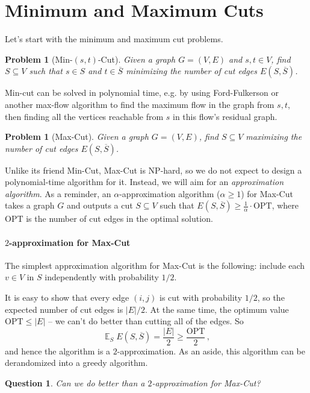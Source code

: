 \documentclass[11pt]{article}
\newtheorem{problem}[theorem]{Problem}
\newtheorem*{question}{Question}
\DeclareMathOperator{\E}{\mathbb{E}} %
\begin{document}
\section{Minimum and Maximum Cuts}

Let's start with the minimum and maximum cut problems.
\begin{problem}[Min-$(s,t)$-Cut]
Given a graph $G = (V,E)$ and $s,t \in V$, find $S \subseteq V$ such that $s \in S$ and $t \in \overline{S}$ minimizing the number of cut edges $E(S,\overline{S})$.
\end{problem}

Min-cut can be solved in polynomial time, e.g. by using Ford-Fulkerson or another max-flow algorithm to find the maximum flow in the graph from $s,t$, then finding all the vertices reachable from $s$ in this flow's residual graph.

\begin{problem}[Max-Cut]
Given a graph $G = (V,E)$, find $S \subseteq V$ maximizing the number of cut edges $E(S,\overline{S})$.
\end{problem}

Unlike its friend Min-Cut, Max-Cut is NP-hard, so we do not expect to design a polynomial-time algorithm for it.
Instead, we will aim for an \emph{approximation algorithm}.
As a reminder, an $\alpha$-approximation algorithm ($\alpha \geq 1$) for Max-Cut takes a graph $G$ and outputs a cut $S \subseteq V$ such that $E(S,\overline{S}) \geq \frac 1 \alpha \cdot \text{OPT}$, where $\text{OPT}$ is the number of cut edges in the optimal solution.

\paragraph{$2$-approximation for Max-Cut}
The simplest approximation algorithm for Max-Cut is the following: include each $v \in V$ in $S$ independently with probability $1/2$.

It is easy to show that every edge $(i,j)$ is cut with probability $1/2$, so the expected number of cut edges is $|E|/2$.
At the same time, the optimum value $\text{OPT} \leq |E|$ -- we can't do better than cutting all of the edges.
So
\[
\E_S E(S,\overline{S}) = \frac{|E|}{2} \geq \frac{\text{OPT}}{2} \, ,
\]
and hence the algorithm is a $2$-approximation.
As an aside, this algorithm can be derandomized into a greedy algorithm.

\begin{question}
Can we do better than a $2$-approximation for Max-Cut?
\end{question}
\end{document}
